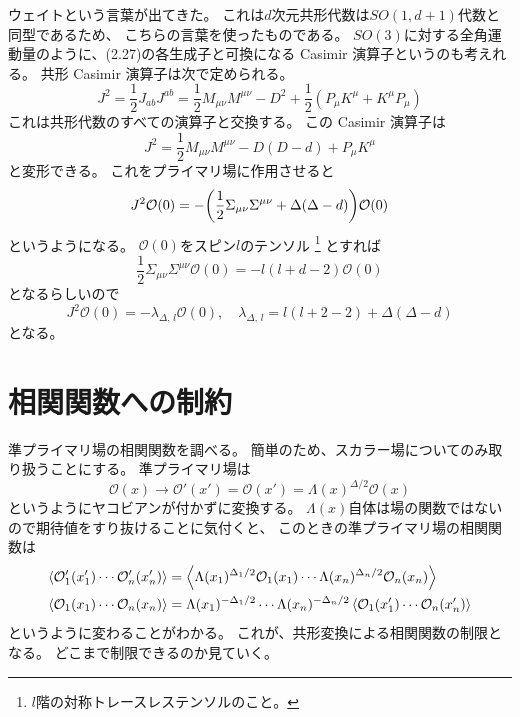 \documentclass[../../master.tex]{subfiles}
\begin{document}
ウェイトという言葉が出てきた。
これは\(d\)次元共形代数は\(SO(1,d+1)\)代数と同型であるため、
こちらの言葉を使ったものである。
\(SO(3)\)に対する全角運動量のように、(2.27)の各生成子と可換になる
Casimir 演算子というのも考えれる。
共形 Casimir 演算子は次で定められる。
\begin{equation*}
    J^2 = \frac{1}{2} J_{ab}J^{ab} = \frac{1}{2}M_{\mu\nu}M^{\mu\nu} - D^2 + \frac{1}{2}(P_\mu K^\mu + K^\mu P_\mu)
\end{equation*}
これは共形代数のすべての演算子と交換する。
この Casimir 演算子は
\begin{equation*}
    J^2 = \frac{1}{2}M_{\mu\nu}M^{\mu\nu} - D(D-d) + P_\mu K^\mu
\end{equation*}
と変形できる。
これをプライマリ場に作用させると
\begin{equation*}
    J^2 \mathcal{O}(0) = -\qty(\frac{1}{2}\Sigma_{\mu\nu}\Sigma^{\mu\nu}+\Delta(\Delta-d))\mathcal{O}(0)
\end{equation*}
というようになる。
\(\mathcal{O}(0)\)をスピン\(l\)のテンソル
\footnote{\(l\)階の対称トレースレステンソルのこと。}
とすれば
\begin{equation*}
    \frac{1}{2}\Sigma_{\mu\nu}\Sigma^{\mu\nu} \mathcal{O}(0) = -l(l+d-2)\mathcal{O}(0)
\end{equation*}
となるらしいので
\begin{equation*}
    J^2\mathcal{O}(0) = -\lambda_{\Delta,\,l}\mathcal{O}(0),\quad \lambda_{\Delta,\,l} = l(l+2-2)+\Delta(\Delta-d)
\end{equation*}
となる。

\section{相関関数への制約}
準プライマリ場の相関関数を調べる。
簡単のため、スカラー場についてのみ取り扱うことにする。
準プライマリ場は
\setcounter{equation}{63}
\begin{equation*}
    \mathcal{O}(x)\rightarrow\mathcal{O}'(x') = \mathcal{O}(x')=\Lambda(x)^{\Delta/2}\mathcal{O}(x)
\end{equation*}
というようにヤコビアンが付かずに変換する。
\(\Lambda(x)\)自体は場の関数ではないので期待値をすり抜けることに気付くと、
このときの準プライマリ場の相関関数は
\begin{align}
    \ev{\mathcal{O}'_1(x'_1)\cdots\mathcal{O}'_n(x'_n)}
    &= \ev{\Lambda(x_1)^{\Delta_1/2}\mathcal{O}_1(x_1)\cdots\Lambda(x_n)^{\Delta_n/2}\mathcal{O}_n(x_n)} \notag\\
    \ev{\mathcal{O}_1(x_1)\cdots\mathcal{O}_n(x_n)}
    &= \Lambda(x_1)^{-\Delta_1/2}\cdots\Lambda(x_n)^{-\Delta_n/2}\ev{\mathcal{O}_1(x'_1)\cdots\mathcal{O}_n(x'_n)}
\end{align}
というように変わることがわかる。%
これが、共形変換による相関関数の制限となる。
どこまで制限できるのか見ていく。
\end{document}
